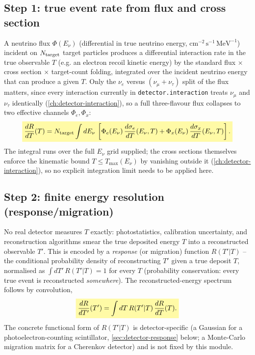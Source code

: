\begin{theorybox}
\subsection*{Step 1: true event rate from flux and cross section}
A neutrino flux $\Phi(E_\nu)$ (differential in true neutrino energy,
$\mathrm{cm^{-2}\,s^{-1}\,MeV^{-1}}$) incident on $N_{\rm target}$ target
particles produces a differential interaction rate in the true
observable $T$ (e.g. an electron recoil kinetic energy) by the standard
flux $\times$ cross section $\times$ target-count folding, integrated over
the incident neutrino energy that can produce a given $T$. Only the $\nu_e$
versus $(\nu_\mu+\nu_\tau)$ split of the flux matters, since every
interaction currently in \texttt{detector.interaction} treats $\nu_\mu$ and
$\nu_\tau$ identically (\cref{ch:detector-interaction}), so a full
three-flavour flux collapses to two effective channels $\Phi_e,\Phi_x$:
\begin{equation}
  \keyresult{\frac{dR}{dT}(T) = N_{\rm target}\int dE_\nu\,
    \left[\Phi_e(E_\nu)\,\frac{d\sigma_e}{dT}(E_\nu,T)
        + \Phi_x(E_\nu)\,\frac{d\sigma_x}{dT}(E_\nu,T)\right].}
  \label{eq:detector-true-rate}
\end{equation}
The integral runs over the full $E_\nu$ grid supplied; the cross sections
themselves enforce the kinematic bound $T\leq T_{\max}(E_\nu)$ by vanishing
outside it (\cref{ch:detector-interaction}), so no explicit integration
limit needs to be applied here.

\subsection*{Step 2: finite energy resolution (response/migration)}
No real detector measures $T$ exactly: photostatistics, calibration
uncertainty, and reconstruction algorithms smear the true deposited energy
$T$ into a reconstructed observable $T'$. This is encoded by a
\emph{response} (or migration) function $R(T'|T)$ -- the conditional
probability density of reconstructing $T'$ given a true deposit $T$,
normalised as $\int dT'\,R(T'|T)=1$ for every $T$ (probability
conservation: every true event is reconstructed \emph{somewhere}). The
reconstructed-energy spectrum follows by convolution,
\begin{equation}
  \keyresult{\frac{dR}{dT'}(T') = \int dT\,R(T'|T)\,\frac{dR}{dT}(T).}
  \label{eq:detector-response}
\end{equation}
The concrete functional form of $R(T'|T)$ is detector-specific (a Gaussian
for a photoelectron-counting scintillator, \cref{sec:detector-response}
below; a Monte-Carlo migration matrix for a Cherenkov detector) and is not
fixed by this module.


\end{theorybox}
